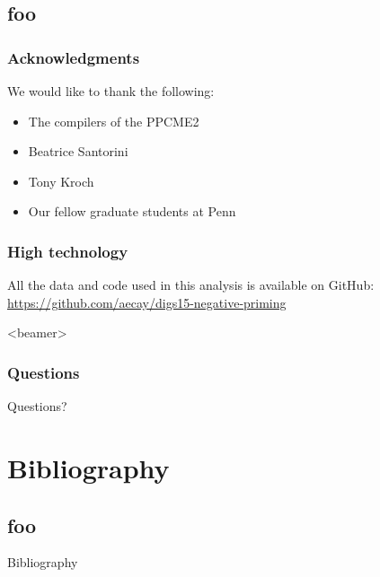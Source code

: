 \documentclass{digs-slides}
\begin{document}
\subsection{foo}

\begin{frame}
    \frametitle{Acknowledgments}
    We would like to thank the following:
    \begin{itemize}
      \item The compilers of the PPCME2
      \item Beatrice Santorini
      \item Tony Kroch
      \item Our fellow graduate students at Penn
    \end{itemize}
\end{frame}

\begin{frame}
    \frametitle{High technology}
    All the data and code used in this analysis is available on GitHub:
    \url{https://github.com/aecay/digs15-negative-priming}

\end{frame}

\begin{frame}<beamer>
    \frametitle{Questions}
    \begin{center}
        \Huge
        Questions?
    \end{center}
\end{frame}

\section{Bibliography}
\label{sec:bibliography}

\subsection*{foo}

\begin{frame}[allowframebreaks=0.9]{Bibliography}
    \printbibliography[heading=none]
\end{frame}
\end{document}
